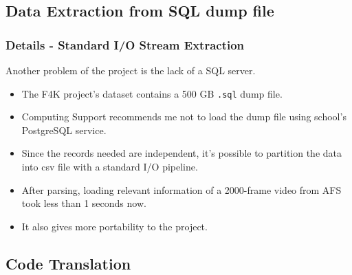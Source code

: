 \documentclass{beamer}[fullspacing]
\begin{document}
\subsection{Data Extraction from SQL dump file}

\begin{frame}
\frametitle{Details - Standard I/O Stream Extraction}

Another problem of the project is the lack of a SQL server.
\begin{itemize}
\item
The F4K project's dataset contains a 500 GB {\tt .sql} dump file.
\item
Computing Support recommends me not to load the dump file using school's PostgreSQL service.
\item
Since the records needed are independent, it's possible to partition the data into csv file with a standard I/O pipeline.
\item
After parsing, loading relevant information of a 2000-frame video from AFS took less than 1 seconds now.
\item
It also gives more portability to the project.
\end{itemize}

\end{frame}



\subsection{Code Translation}
\end{document}
